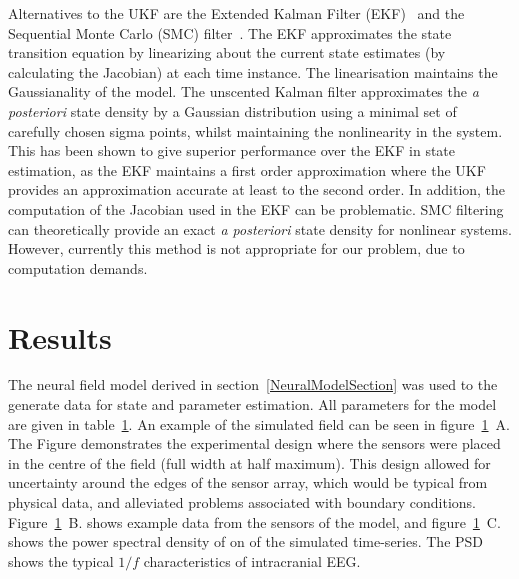 \documentclass[12pt]{iopart}		%
\begin{document}

Alternatives to the UKF are the Extended Kalman Filter (EKF)~\cite{Haykin2001} and the Sequential Monte Carlo (SMC) filter~\cite{doucet2001}. The EKF approximates the state transition equation by linearizing about the current state estimates (by calculating the Jacobian) at each time instance. The linearisation maintains the Gaussianality of the model. The unscented Kalman filter approximates the \emph{a posteriori} state density by a Gaussian distribution using a minimal set of carefully chosen sigma points, whilst maintaining the nonlinearity in the system. This has been shown to give superior performance over the EKF in state estimation, as the EKF maintains a first order approximation where the UKF provides an approximation accurate at least to the second order. In addition, the computation of the Jacobian used in the
EKF can be problematic. SMC filtering can theoretically provide an exact \emph{a posteriori} state density for nonlinear systems. However, currently this method is not appropriate for our problem, due to computation demands. %

\section{Results}
The neural field model derived in section~\ref{NeuralModelSection} was used to the generate data for state and parameter estimation. All parameters for the model are given in table~\ref{}. An example of the simulated field can be seen in figure~\ref{}~A. The Figure demonstrates the experimental design where the sensors were placed in the centre of the field (full width at half maximum). This design allowed for uncertainty around the edges of the sensor array, which would be typical from physical data, and alleviated problems associated with boundary conditions. Figure~\ref{}~B. shows example data from the sensors of the model, and figure~\ref{}~C. shows the power spectral density of on of the simulated time-series. The PSD shows the typical $1/f$ characteristics of intracranial EEG.
\end{document}
